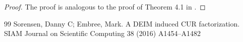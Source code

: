 \documentclass[10pt,a4paper]{amsart}
\begin{document}
\begin{proof}
    The proof is analogous to the proof of Theorem 4.1 in \cite{sorensen2016deim}.
\end{proof}

\begin{thebibliography}{99}
 Sorensen, Danny C; Embree, Mark. A {DEIM} induced {CUR} factorization. SIAM Journal on Scientific Computing 38 (2016) A1454--A1482
\end{thebibliography}
\end{document}
